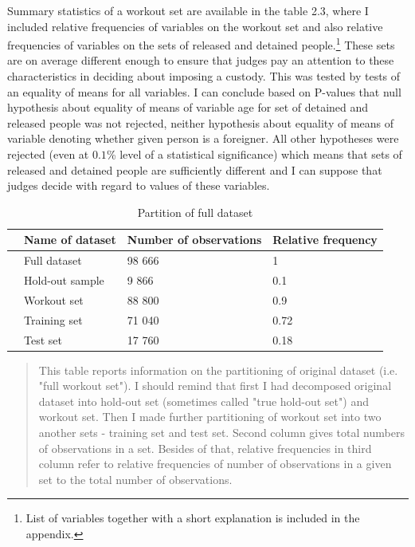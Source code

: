 \documentclass[12pt, twoside,openany]{book} %
\begin{document}
Summary statistics of a workout set are available in the table 2.3, where I included relative frequencies of variables on the workout set and also relative frequencies of variables on the sets of released and detained people.\footnote{List of variables together with a short explanation is included in the appendix.} These sets are on average different enough to ensure that judges pay an attention to these characteristics in deciding about imposing a custody. This was tested by tests of an equality of means for all variables. I can conclude based on P-values that null hypothesis about equality of means of variable age for set of detained and released people was not rejected, neither hypothesis about equality of means of variable denoting whether given person is a foreigner. All other hypotheses were rejected (even at $0.1$\% level of a statistical significance) which means that sets of released and detained people are sufficiently different and I can suppose that judges decide with regard to values of these variables.\newline




\begin{table}[t]
\centering
\begin{tabular}{rlll}
  \hline
 & Name of dataset & Number of observations & Relative frequency\\ 
  \hline
 & Full dataset & 98 666 & 1 \\ 
  & Hold-out sample & 9 866 & 0.1 \\ 
   & Workout set & 88 800 & 0.9 \\ 
   & 	\hspace{1cm}Training set & 71 040 & 0.72 \\ 
  & 	\hspace{1cm}Test set & 17 760 & 0.18 \\ 
      \hline
\end{tabular}

\caption{Partition of full dataset}
\medskip
{\small
\begin{quotation}
 This table reports information on the partitioning of original dataset (i.e. "full workout set"). I should remind that first I had decomposed original dataset into hold-out set (sometimes called "true hold-out set") and workout set. Then I made further partitioning of workout set into two another sets - training set and test set. Second column gives total numbers of observations in a set. Besides of that, relative frequencies in third column refer to relative frequencies of number of observations in a given set to the total number of observations. 
\end{quotation}
}

\end{table}
\end{document}
